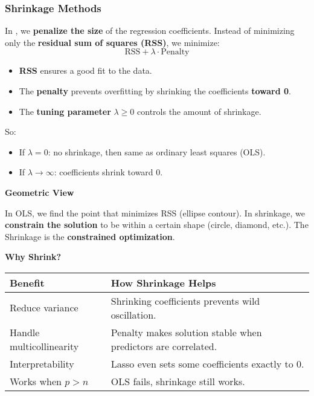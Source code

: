 \subsubsection{Shrinkage Methods}

In , we \textbf{penalize the size} of the regression coefficients. Instead of minimizing only the \textbf{residual sum of squares (RSS)}, we minimize:
\begin{equation*}
    \text{RSS} + \lambda \cdot \text{Penalty}
\end{equation*}
\begin{itemize}
    \item \textbf{RSS} ensures a good fit to the data.
    \item The \textbf{penalty} prevents overfitting by shrinking the coefficients \textbf{toward 0}.
    \item The \textbf{tuning parameter} $\lambda \geq 0$ controls the amount of shrinkage.
\end{itemize}
So:
\begin{itemize}
    \item If $\lambda = 0$: no shrinkage, then same as ordinary least squares (OLS).
    \item If $\lambda \to \infty$: coefficients shrink toward 0.
\end{itemize}

\highspace
\begin{flushleft}
    \textcolor{Green3}{ \textbf{Geometric View}}
\end{flushleft}
In OLS, we find the point that minimizes RSS (ellipse contour). In shrinkage, we \textbf{constrain the solution} to be within a certain shape (circle, diamond, etc.). The Shrinkage is the \textbf{constrained optimization}.

\highspace
\begin{flushleft}
    \textcolor{Green3}{ \textbf{Why Shrink?}}
\end{flushleft}
\begin{table}[!htp]
    \centering
    \begin{tabular}{@{} l p{22em} @{}}
        \toprule
        \textbf{Benefit} & \textbf{How Shrinkage Helps} \\
        \midrule
        Reduce variance             & Shrinking coefficients prevents wild oscillation.             \\ [.3em]
        Handle multicollinearity    & Penalty makes solution stable when predictors are correlated. \\ [.3em]
        Interpretability            & Lasso even sets some coefficients exactly to 0.               \\ [.3em]
        Works when $p > n$          & OLS fails, shrinkage still works.                             \\
        \bottomrule
    \end{tabular}
\end{table}

